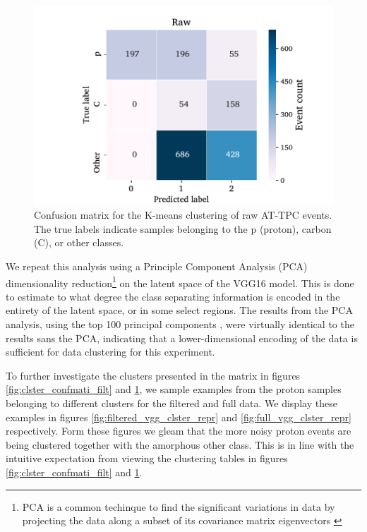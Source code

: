 \documentclass[review,number,sort&compress]{elsarticle}
\begin{document}
\begin{figure}
	\includegraphics[width=\textwidth]{custom_work/Rawvgg_conf_mat.pdf}
\caption[Pre-trained network - confusion matrices]{Confusion matrix for the K-means clustering of raw AT-TPC events. The true labels indicate samples belonging to the p (proton), carbon (C), or other classes. }\label{fig:clster_confmati_raw}
\end{figure}


We repeat this analysis using a Principle Component Analysis (PCA) dimensionality reduction\footnote{
PCA is a common techinque to find the significant variations in data by projecting the data along a subset of its covariance matrix eigenvectors \cite{Marsland2009}
} on the latent space of the VGG16 model. This is done to estimate to what degree the class separating information is encoded in the entirety of the latent space, or in some select regions. The results from the PCA analysis, using the top 100 principal components , were virtually identical to the results sans the PCA, indicating that a lower-dimensional encoding of the data is sufficient for data clustering for this experiment.

To further investigate the clusters presented in the matrix in figures \ref{fig:clster_confmati_filt} and \ref{fig:clster_confmati_raw}, we sample examples from the proton samples belonging to different clusters for the filtered and full data.
We display these examples in figures \ref{fig:filtered_vgg_clster_repr} and \ref{fig:full_vgg_clster_repr} respectively. Form these figures we gleam that the more noisy proton events are being clustered together with the amorphous other class. This is in line with the intuitive expectation from viewing the clustering tables in figures \ref{fig:clster_confmati_filt} and \ref{fig:clster_confmati_raw}.
\end{document}
